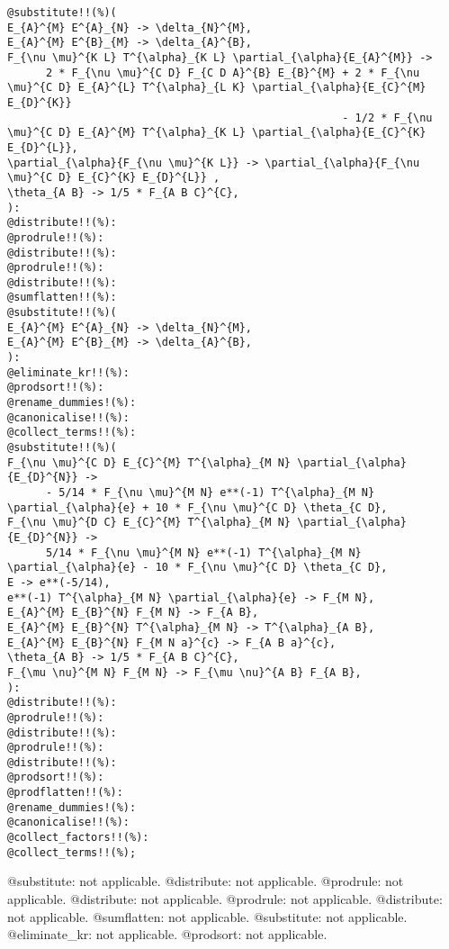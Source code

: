 \documentclass[11pt]{article}
\begin{document}
{\color[named]{Blue}\begin{verbatim}
@substitute!!(%)(
E_{A}^{M} E^{A}_{N} -> \delta_{N}^{M},
E_{A}^{M} E^{B}_{M} -> \delta_{A}^{B},
F_{\nu \mu}^{K L} T^{\alpha}_{K L} \partial_{\alpha}{E_{A}^{M}} ->
      2 * F_{\nu \mu}^{C D} F_{C D A}^{B} E_{B}^{M} + 2 * F_{\nu \mu}^{C D} E_{A}^{L} T^{\alpha}_{L K} \partial_{\alpha}{E_{C}^{M} E_{D}^{K}}
                                                    - 1/2 * F_{\nu \mu}^{C D} E_{A}^{M} T^{\alpha}_{K L} \partial_{\alpha}{E_{C}^{K} E_{D}^{L}},
\partial_{\alpha}{F_{\nu \mu}^{K L}} -> \partial_{\alpha}{F_{\nu \mu}^{C D} E_{C}^{K} E_{D}^{L}} ,
\theta_{A B} -> 1/5 * F_{A B C}^{C},
):
@distribute!!(%):
@prodrule!!(%):
@distribute!!(%):
@prodrule!!(%):
@distribute!!(%):
@sumflatten!!(%):
@substitute!!(%)(
E_{A}^{M} E^{A}_{N} -> \delta_{N}^{M},
E_{A}^{M} E^{B}_{M} -> \delta_{A}^{B},
):
@eliminate_kr!!(%):
@prodsort!!(%):
@rename_dummies!(%):
@canonicalise!!(%):
@collect_terms!!(%):
@substitute!!(%)(
F_{\nu \mu}^{C D} E_{C}^{M} T^{\alpha}_{M N} \partial_{\alpha}{E_{D}^{N}} ->
      - 5/14 * F_{\nu \mu}^{M N} e**(-1) T^{\alpha}_{M N} \partial_{\alpha}{e} + 10 * F_{\nu \mu}^{C D} \theta_{C D},
F_{\nu \mu}^{D C} E_{C}^{M} T^{\alpha}_{M N} \partial_{\alpha}{E_{D}^{N}} ->
      5/14 * F_{\nu \mu}^{M N} e**(-1) T^{\alpha}_{M N} \partial_{\alpha}{e} - 10 * F_{\nu \mu}^{C D} \theta_{C D},
E -> e**(-5/14),
e**(-1) T^{\alpha}_{M N} \partial_{\alpha}{e} -> F_{M N},
E_{A}^{M} E_{B}^{N} F_{M N} -> F_{A B},
E_{A}^{M} E_{B}^{N} T^{\alpha}_{M N} -> T^{\alpha}_{A B},
E_{A}^{M} E_{B}^{N} F_{M N a}^{c} -> F_{A B a}^{c},
\theta_{A B} -> 1/5 * F_{A B C}^{C},
F_{\mu \nu}^{M N} F_{M N} -> F_{\mu \nu}^{A B} F_{A B},
):
@distribute!!(%):
@prodrule!!(%):
@distribute!!(%):
@prodrule!!(%):
@distribute!!(%):
@prodsort!!(%):
@prodflatten!!(%):
@rename_dummies!(%):
@canonicalise!!(%):
@collect_factors!!(%):
@collect_terms!!(%);
\end{verbatim}}
@substitute: not applicable.
@distribute: not applicable.
@prodrule: not applicable.
@distribute: not applicable.
@prodrule: not applicable.
@distribute: not applicable.
@sumflatten: not applicable.
@substitute: not applicable.
@eliminate\_kr: not applicable.
@prodsort: not applicable.
\end{document}
